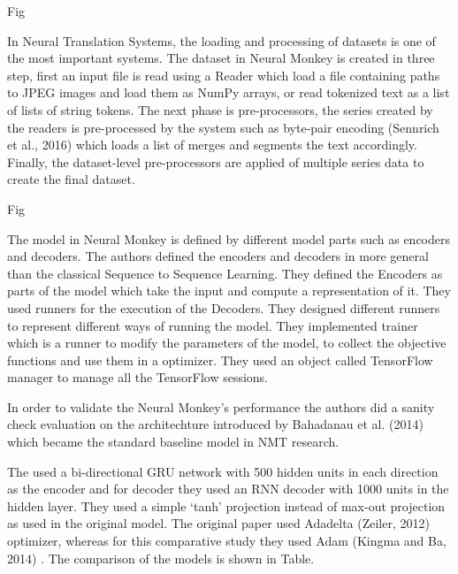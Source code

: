 Fig 








In Neural Translation Systems, the loading and processing of datasets is one of the most important systems. The dataset in Neural Monkey is created in three step, first an input file is read using a Reader which load a file containing paths to JPEG images and load them as NumPy arrays, or read tokenized text as a list of lists of string tokens. The next phase is pre-processors, the series created by the readers is pre-processed by the system such as byte-pair encoding (Sennrich et al., 2016) which loads a list of merges and segments the text accordingly. Finally, the dataset-level pre-processors are applied of multiple series data to create the final dataset. 





Fig







The model in Neural Monkey is defined by different model parts such as encoders and decoders. The authors defined the encoders and decoders in more general than the classical Sequence to Sequence Learning. They defined the Encoders as parts of the model which take the input and compute a representation of it. They used runners for the execution of the Decoders. They designed different runners to represent different ways of running the model. They implemented trainer which is a runner to modify the parameters of the model, to collect the objective functions and use them in a optimizer. They used an object called TensorFlow manager to manage all the TensorFlow sessions. 

In order to validate the Neural Monkey’s performance the authors did a sanity check evaluation on the architechture introduced by Bahadanau et al. (2014) which became the standard baseline model in NMT research. 








The used a bi-directional GRU network with 500 hidden units in each direction as the encoder and for decoder they used an RNN decoder with 1000 units in the hidden layer. They used a simple ‘tanh’ projection instead of max-out projection as used in the original model. The original paper used Adadelta (Zeiler, 2012) optimizer, whereas for this comparative study they used Adam (Kingma and Ba, 2014) . The comparison of the models is shown in Table. 


